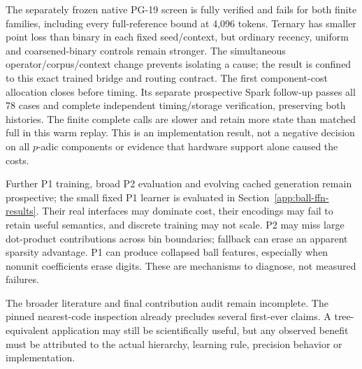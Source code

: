 \documentclass[11pt]{article}
\begin{document}
The separately frozen native PG-19 screen is fully verified and fails for
both finite families, including every full-reference bound at 4,096 tokens.
Ternary has smaller point loss than binary in each fixed seed/context, but
ordinary recency, uniform and coarsened-binary controls remain stronger.
The simultaneous operator/corpus/context change prevents isolating a cause;
the result is confined to this exact trained bridge and routing contract.
The first component-cost allocation closes before timing. Its separate
prospective Spark follow-up passes all 78 cases and complete independent
timing/storage verification, preserving both histories. The finite complete
calls are slower and retain more state than matched full in this warm replay.
This is an implementation result, not a negative decision on all \(p\)-adic
components or evidence that hardware support alone caused the costs.

Further P1 training, broad P2 evaluation and evolving cached generation remain
prospective; the small fixed P1 learner is evaluated in
Section~\ref{app:ball-ffn-results}. Their real interfaces
may dominate cost, their encodings may fail to retain useful semantics, and
discrete training may not scale. P2 may miss large dot-product contributions
across bin boundaries; fallback can erase an apparent sparsity advantage.
P1 can produce collapsed ball features, especially when nonunit coefficients
erase digits. These are mechanisms to diagnose, not measured failures.

The broader literature and final contribution audit remain incomplete. The
pinned nearest-code inspection already precludes several first-ever claims. A tree-equivalent application may
still be scientifically useful, but any observed benefit must be attributed
to the actual hierarchy, learning rule, precision behavior or implementation.
\end{document}
